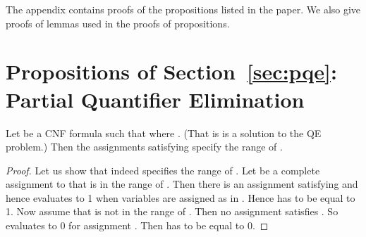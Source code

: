 \appendix
\setcounter{proposition}{0}


The appendix contains   proofs of the propositions  listed in the paper.
We also give proofs of lemmas  used in the proofs of propositions.

\section*{Propositions of Section~\ref{sec:pqe}: Partial Quantifier Elimination}
\begin{proposition}
Let  be a CNF formula such that  where
. (That is  is a solution to the QE problem.)
Then the assignments satisfying  specify the range of .
\end{proposition}
\begin{proof}
Let us show that  indeed specifies the range of . Let  be
a complete assignment to  that is in the range of . Then there
is an assignment  satisfying  and hence
 evaluates to 1 when variables  are assigned as in 
. Hence  has to be equal to 1.  Now assume that
 is not in the range of . Then no assignment
 satisfies . So  evaluates to
0 for assignment . Then  has to be equal to 0.
\end{proof}

